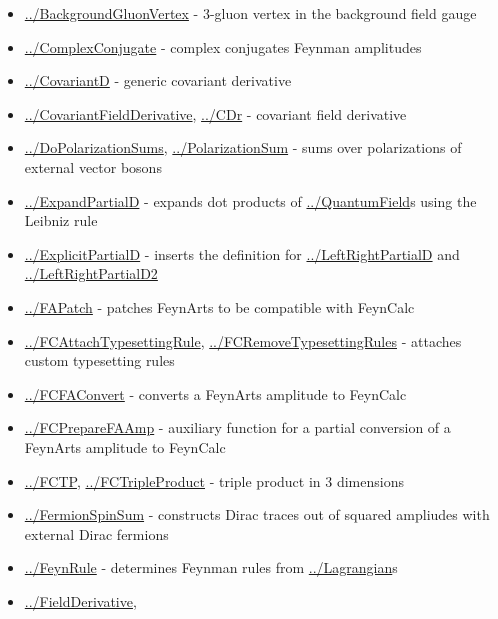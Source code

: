 \documentclass[../FeynCalcManual.tex]{subfiles}
\begin{document}
\begin{itemize}
\tightlist
\item
  \hyperlink{../backgroundgluonvertex}{../BackgroundGluonVertex} -
  \(3\)-gluon vertex in the background field gauge
\item
  \hyperlink{../complexconjugate}{../ComplexConjugate} - complex
  conjugates Feynman amplitudes
\item
  \hyperlink{../covariantd}{../CovariantD} - generic covariant
  derivative
\item
  \hyperlink{../covariantfieldderivative}{../CovariantFieldDerivative},
  \hyperlink{../cdr}{../CDr} - covariant field derivative
\item
  \hyperlink{../dopolarizationsums}{../DoPolarizationSums},
  \hyperlink{../polarizationsum}{../PolarizationSum} - sums over
  polarizations of external vector bosons
\item
  \hyperlink{../expandpartiald}{../ExpandPartialD} - expands dot
  products of \hyperlink{../quantumfield}{../QuantumField}s using the
  Leibniz rule
\item
  \hyperlink{../explicitpartiald}{../ExplicitPartialD} - inserts the
  definition for \hyperlink{../leftrightpartiald}{../LeftRightPartialD}
  and \hyperlink{../leftrightpartiald2}{../LeftRightPartialD2}
\item
  \hyperlink{../fapatch}{../FAPatch} - patches FeynArts to be compatible
  with FeynCalc
\item
  \hyperlink{../fcattachtypesettingrule}{../FCAttachTypesettingRule},
  \hyperlink{../fcremovetypesettingrules}{../FCRemoveTypesettingRules} -
  attaches custom typesetting rules
\item
  \hyperlink{../fcfaconvert}{../FCFAConvert} - converts a FeynArts
  amplitude to FeynCalc
\item
  \hyperlink{../fcpreparefaamp}{../FCPrepareFAAmp} - auxiliary function
  for a partial conversion of a FeynArts amplitude to FeynCalc
\item
  \hyperlink{../fctp}{../FCTP},
  \hyperlink{../fctripleproduct}{../FCTripleProduct} - triple product in
  3 dimensions
\item
  \hyperlink{../fermionspinsum}{../FermionSpinSum} - constructs Dirac
  traces out of squared ampliudes with external Dirac fermions
\item
  \hyperlink{../feynrule}{../FeynRule} - determines Feynman rules from
  \hyperlink{../lagrangian}{../Lagrangian}s
\item
  \hyperlink{../fieldderivative}{../FieldDerivative},

\end{itemize}
\end{document}
